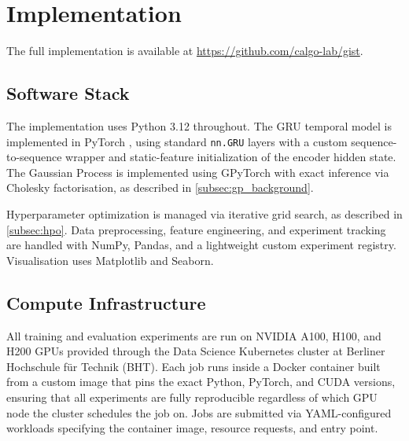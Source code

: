 \section{Implementation}
\label{sec:implementation}

The full implementation is available at \url{https://github.com/calgo-lab/gist}.

\subsection{Software Stack}
\label{sec:software}

The implementation uses Python 3.12 throughout. The GRU temporal model is implemented in
PyTorch \citep{paszke2019pytorch}, using standard \texttt{nn.GRU} layers with a custom
sequence-to-sequence wrapper and static-feature initialization of the encoder hidden state.
The Gaussian Process is implemented using GPyTorch \citep{gardner2018gpytorch} with exact
inference via Cholesky factorisation, as described in \cref{subsec:gp_background}.

Hyperparameter optimization is managed via iterative grid search, as described in \cref{subsec:hpo}.
Data preprocessing, feature engineering, and experiment tracking are handled with NumPy,
Pandas, and a lightweight custom experiment registry. Visualisation uses Matplotlib and
Seaborn.

\subsection{Compute Infrastructure}
\label{sec:compute}

All training and evaluation experiments are run on NVIDIA A100, H100, and H200 GPUs
provided through the Data Science Kubernetes cluster at Berliner Hochschule für Technik (BHT). Each job runs inside a Docker container built
from a custom image that pins the exact Python, PyTorch, and CUDA versions, ensuring that
all experiments are fully reproducible regardless of which GPU node the cluster schedules
the job on. Jobs are submitted via YAML-configured workloads specifying the container image,
resource requests, and entry point.


